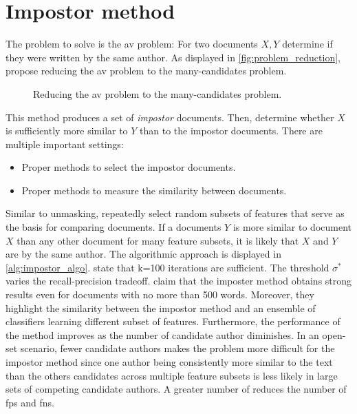 \section{Impostor method}
\label{sec:impostor_method}

The problem to solve is the \ac{av} problem:
For two documents $X, Y$ determine if they were written by the same author.
As displayed in \autoref{fig:problem_reduction}, \citet{koppel_determining_2014} propose reducing the \ac{av} problem to the many-candidates problem.

\begin{figure}[htbp]
    \centering
    
    \caption{Reducing the \ac{av} problem to the many-candidates problem.}
    \label{fig:problem_reduction}
\end{figure}

This method produces a set of \textit{impostor} documents.
Then, \citet{koppel_determining_2014} determine whether $X$ is sufficiently more similar to $Y$ than to the impostor documents.
There are multiple important settings:
\begin{itemize}
    \item Proper methods to select the impostor documents.
    \item Proper methods to measure the similarity between documents.
\end{itemize}
Similar to unmasking, \citet{koppel_determining_2014} repeatedly select random subsets of features that serve as the basis for comparing documents.
If a documents $Y$ is more similar to document $X$ than any other document for many feature subsets, 
it is likely that $X$ and $Y$ are by the same author.
The algorithmic approach is displayed in \autoref{alg:impostor_algo}.
\citet{koppel_determining_2014} state that k=100 iterations are sufficient.
The threshold $\sigma^*$ varies the recall-precision tradeoff.
\citet{koppel_determining_2014} claim that the imposter method obtains strong results even for documents with no more than 500 words.
Moreover, they highlight the similarity between the impostor method and an ensemble of classifiers learning different subset of features.
Furthermore, the performance of the method improves as the number of candidate author diminishes.
In an open-set scenario, fewer candidate authors makes the problem more difficult for the impostor method 
since one author being consistently more similar to the text than the others candidates across multiple feature subsets is less likely in large sets of competing candidate authors.
A greater number of \imps{} reduces the number of \acp{fp} and \acp{fn}.


